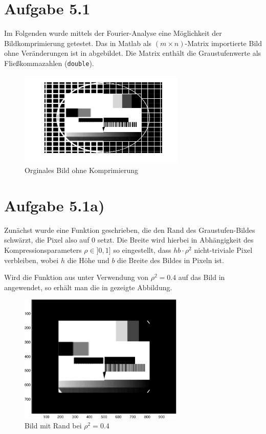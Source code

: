 \section*{Aufgabe 5.1}
Im Folgenden wurde mittels der Fourier-Analyse eine Möglichkeit der Bildkomprimierung
getestet. Das in Matlab als $(m\times n)$-Matrix importierte Bild ohne Veränderungen ist
in  abgebildet. Die Matrix enthält die Graustufenwerte als Fließkommazahlen
(\texttt{double}).

\begin{figure}[htb]
\centering
  \includegraphics[width=0.7\textwidth,keepaspectratio]{../tmp/original}
  \caption{Orginales Bild ohne Komprimierung}
  \label{fig:orig}
\end{figure}

\section*{Aufgabe 5.1a)}

Zunächst wurde eine Funktion  geschrieben, die den Rand des Graustufen-Bildes
schwärzt, die Pixel also auf 0 setzt. Die Breite wird hierbei in Abhängigkeit
des Kompressionsparameters $ρ \in ]0,1]$ so eingestellt, dass $hb\cdot ρ^2$
nicht-triviale Pixel verbleiben, wobei $h$ die Höhe und $b$ die Breite des
Bildes in Pixeln ist.

Wird die Funktion aus  unter Verwendung von $ρ^2 = 0.4$ auf das
Bild in  angewendet, so erhält man die in  gezeigte Abbildung.



\begin{figure}[htb]
\centering
  \includegraphics[width=0.7\textwidth,keepaspectratio]{../tmp/eins_a-crop.pdf}
  \caption{Bild mit Rand bei $ρ^2 = 0.4$}
  \label{fig:1a}
\end{figure}

